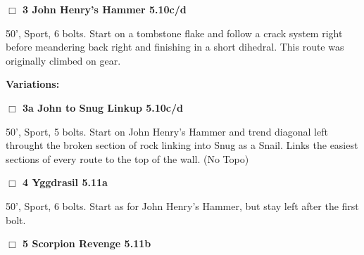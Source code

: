 	\begin{multicols}{2}

\needspace{2em}
\label{rt:John Henry's Hammer}
\colorbox{RoyalBlue!20}{
\parbox{0.95\linewidth}{
\hspace{-1ex}\textbf{$\Box$
3 John Henry's Hammer 5.10c/d  
}}}
\begin{adjustwidth}{1.3em}{}			

50', Sport, 6 bolts. Start on a tombstone flake and follow a crack system right before meandering back right and finishing in a short dihedral. This route was originally climbed on gear.
\end{adjustwidth}


\begin{adjustwidth}{0.5cm}{}				
\needspace{4em}
\textbf{Variations:} \newline

\needspace{2em}
\label{vr:John to Snug Linkup}
\colorbox{RoyalBlue!20}{
\parbox{0.95\linewidth}{
\hspace{-1ex}\textbf{$\Box$
3a John to Snug Linkup 5.10c/d  
}}}
\begin{adjustwidth}{1.3em}{}			

50', Sport, 5 bolts. Start on John Henry's Hammer and trend diagonal left throught the broken section of rock linking into Snug as a Snail. Links the easiest sections of every route to the top of the wall.
  (No Topo)
\end{adjustwidth}



\end{adjustwidth}


\needspace{2em}
\label{rt:Yggdrasil}
\colorbox{RoyalBlue!20}{
\parbox{0.95\linewidth}{
\hspace{-1ex}\textbf{$\Box$
4 Yggdrasil 5.11a  
}}}
\begin{adjustwidth}{1.3em}{}			

50', Sport, 6 bolts. Start as for John Henry's Hammer, but stay left after the first bolt.
\end{adjustwidth}




\needspace{2em}
\label{rt:Scorpion Revenge}
\colorbox{RoyalBlue!20}{
\parbox{0.95\linewidth}{
\hspace{-1ex}\textbf{$\Box$
5 Scorpion Revenge 5.11b  
}}}
\begin{adjustwidth}{1.3em}{}			


\end{adjustwidth}
\end{multicols}

